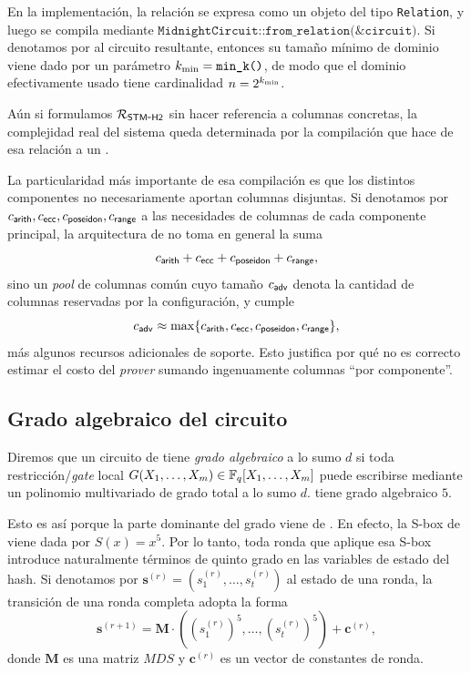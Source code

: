 En la implementación, la relación \STM se expresa como un objeto del tipo \texttt{Relation}, y luego se compila mediante $\texttt{MidnightCircuit::from\_relation(\&circuit)}$. Si denotamos por \MidnightSTMCircuit al circuito resultante, entonces su tamaño mínimo de dominio viene dado por un parámetro $k_{\min} = \texttt{min\_k()}$, de modo que el dominio \EvalDomain efectivamente usado tiene cardinalidad $n = 2^{k_{\min}}$.

Aún si formulamos $\mathcal{R}_{\mathsf{STM\mbox{-}H2}}$ sin hacer referencia a columnas concretas, la complejidad real del sistema queda determinada por la compilación que hace \Midnight de esa relación a un \Layout \HaloTwo.

La particularidad más importante de esa compilación es que los distintos componentes no necesariamente aportan columnas disjuntas. Si denotamos por $c_{\mathsf{arith}}, c_{\mathsf{ecc}}, c_{\mathsf{poseidon}}, c_{\mathsf{range}}$ a las necesidades de columnas de cada componente principal, la arquitectura de \Midnight no toma en general la suma
$$c_{\mathsf{arith}}+c_{\mathsf{ecc}}+c_{\mathsf{poseidon}}+c_{\mathsf{range}},$$
sino un \textit{pool} de columnas común cuyo tamaño $c_{\mathsf{adv}}$ denota la cantidad de columnas \Advice reservadas por la configuración, y cumple
$$c_{\mathsf{adv}} \approx \max\{c_{\mathsf{arith}}, c_{\mathsf{ecc}}, c_{\mathsf{poseidon}}, c_{\mathsf{range}} \},$$
más algunos recursos adicionales de soporte. Esto justifica por qué no es correcto estimar el costo del \textit{prover} sumando ingenuamente columnas ``por componente''.

\subsection{Grado algebraico del circuito}
\label{subsec:stm-halo2-y-complejidad-grado-algebraico-del-circuito}

Diremos que un circuito de \HaloTwo tiene \emph{grado algebraico} a lo sumo $d$ si toda restricción/\textit{gate} local $G(X_1, \ldots, X_m) \in \mathbb{F}_q[X_1, \ldots, X_m]$ puede escribirse mediante un polinomio multivariado de grado total a lo sumo $d$. \MidnightSTMCircuit tiene grado algebraico $5$.

Esto es así porque la parte dominante del grado viene de \MidnightPoseidonHash. En efecto, la S-box de \MidnightPoseidonHash viene dada por $S(x) = x^5$. Por lo tanto, toda ronda que aplique esa S-box introduce naturalmente términos de quinto grado en las variables de estado del hash. Si denotamos por $\mathbf{s}^{(r)} = (s^{(r)}_1, \ldots, s^{(r)}_t)$ al estado de una ronda, la transición de una ronda completa adopta la forma
$$\mathbf{s}^{(r+1)} = \mathbf{M} \cdot \left((s^{(r)}_1)^5, \ldots, (s^{(r)}_t)^5 \right) + \mathbf{c}^{(r)},$$
donde $\mathbf{M}$ es una matriz $MDS$ y $\mathbf{c}^{(r)}$ es un vector de constantes de ronda.

